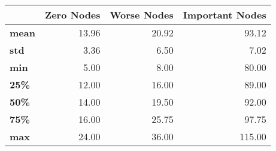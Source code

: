 \begin{tabular}{lrrr}
\toprule
{} &  Zero Nodes &  Worse Nodes &  Important Nodes \\
\midrule
\textbf{mean} &       13.96 &        20.92 &            93.12 \\
\textbf{std } &        3.36 &         6.50 &             7.02 \\
\textbf{min } &        5.00 &         8.00 &            80.00 \\
\textbf{25\% } &       12.00 &        16.00 &            89.00 \\
\textbf{50\% } &       14.00 &        19.50 &            92.00 \\
\textbf{75\% } &       16.00 &        25.75 &            97.75 \\
\textbf{max } &       24.00 &        36.00 &           115.00 \\
\bottomrule
\end{tabular}
